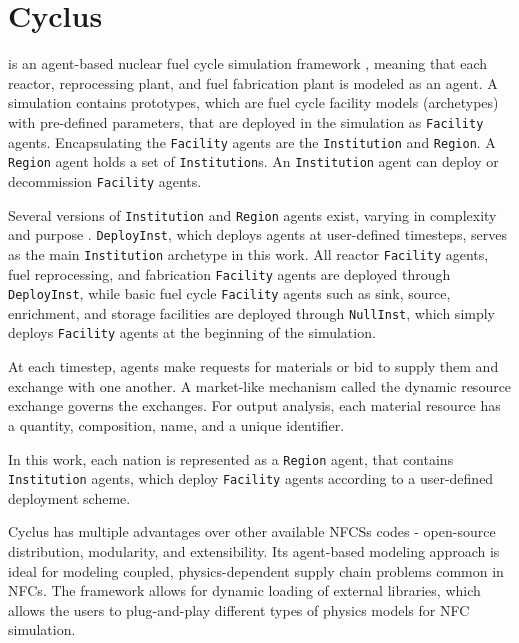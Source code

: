 \section{Cyclus}

\Cyclus is an agent-based nuclear fuel cycle simulation framework 
\cite{huff_fundamental_2016}, meaning
that each reactor, reprocessing plant, and fuel fabrication plant is modeled as an agent.
A \Cyclus simulation contains prototypes, which are fuel cycle facility models (archetypes) with
pre-defined parameters, that are deployed in the simulation as \texttt{Facility} agents.
Encapsulating the \texttt{Facility} agents are the \texttt{Institution} and \texttt{Region}.
A \texttt{Region} agent holds a set of \texttt{Institution}s. 
An \texttt{Institution} agent can deploy or decommission \texttt{Facility} agents.

Several versions of \texttt{Institution}
and \texttt{Region} agents exist, varying in complexity and purpose \cite{huff_extensions_2014}.
\texttt{DeployInst}, which deploys agents at user-defined timesteps, serves
as the main \texttt{Institution} archetype in this work. All reactor \texttt{Facility} agents,
fuel reprocessing, and fabrication \texttt{Facility} agents
are deployed through \texttt{DeployInst}, while basic fuel cycle \texttt{Facility} agents
such as sink, source, enrichment, and storage facilities are deployed 
through \texttt{NullInst}, which simply deploys \texttt{Facility}
agents at the beginning of the simulation.

At each timestep,
agents make requests for materials or bid to supply them and exchange
with one another. A market-like mechanism called the dynamic resource exchange
\cite{gidden_agent-based_2015} governs the exchanges.
For output analysis, each material resource has a quantity, composition, name, and a unique identifier.

In this work, each nation is represented as a \texttt{Region} agent,
that contains \texttt{Institution} agents, which deploy \texttt{Facility} 
agents according to a user-defined deployment scheme.

Cyclus has multiple advantages over other available
\glspl{NFCS} codes - open-source distribution, modularity,
and extensibility. Its agent-based modeling approach
is ideal for modeling coupled, physics-dependent
supply chain problems common in \glspl{NFC}.
The framework allows for dynamic loading of 
external libraries, which allows the users to plug-and-play
different types of physics models for \gls{NFC}
simulation.


